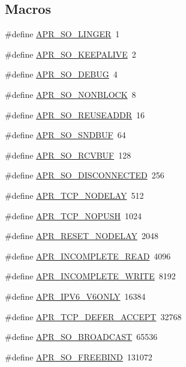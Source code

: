 \subsection*{Macros}
\begin{DoxyCompactItemize}
\item 
\#define \hyperlink{group__apr__sockopt_ga6a807e7b78937ab74a4fcd6e99d76669}{A\+P\+R\+\_\+\+S\+O\+\_\+\+L\+I\+N\+G\+ER}~1
\item 
\#define \hyperlink{group__apr__sockopt_ga0c54c5b98593d9ad2f8cc8836da7eae5}{A\+P\+R\+\_\+\+S\+O\+\_\+\+K\+E\+E\+P\+A\+L\+I\+VE}~2
\item 
\#define \hyperlink{group__apr__sockopt_ga2b30d26f69059692e97a59ec1d6db73b}{A\+P\+R\+\_\+\+S\+O\+\_\+\+D\+E\+B\+UG}~4
\item 
\#define \hyperlink{group__apr__sockopt_gac3bf19cc28b43da9b9dc396c84914a0f}{A\+P\+R\+\_\+\+S\+O\+\_\+\+N\+O\+N\+B\+L\+O\+CK}~8
\item 
\#define \hyperlink{group__apr__sockopt_ga90434074950efa1383d7c5649026a159}{A\+P\+R\+\_\+\+S\+O\+\_\+\+R\+E\+U\+S\+E\+A\+D\+DR}~16
\item 
\#define \hyperlink{group__apr__sockopt_ga0e7ef8d3785eec5210ede9fd309db35f}{A\+P\+R\+\_\+\+S\+O\+\_\+\+S\+N\+D\+B\+UF}~64
\item 
\#define \hyperlink{group__apr__sockopt_ga4ab9494893075c8db6ac26a997f41f0e}{A\+P\+R\+\_\+\+S\+O\+\_\+\+R\+C\+V\+B\+UF}~128
\item 
\#define \hyperlink{group__apr__sockopt_ga5fd72839e254ddec03ffb624c21fa564}{A\+P\+R\+\_\+\+S\+O\+\_\+\+D\+I\+S\+C\+O\+N\+N\+E\+C\+T\+ED}~256
\item 
\#define \hyperlink{group__apr__sockopt_ga24db924d850dea792e92be7f8bc45cbd}{A\+P\+R\+\_\+\+T\+C\+P\+\_\+\+N\+O\+D\+E\+L\+AY}~512
\item 
\#define \hyperlink{group__apr__sockopt_ga7679a9e3114815eb6c31d26db707975d}{A\+P\+R\+\_\+\+T\+C\+P\+\_\+\+N\+O\+P\+U\+SH}~1024
\item 
\#define \hyperlink{group__apr__sockopt_gac9ee12e841eefaf86fabaae4a298adea}{A\+P\+R\+\_\+\+R\+E\+S\+E\+T\+\_\+\+N\+O\+D\+E\+L\+AY}~2048
\item 
\#define \hyperlink{group__apr__sockopt_ga73b6c80791c5148c2a416e03a8a1ff8a}{A\+P\+R\+\_\+\+I\+N\+C\+O\+M\+P\+L\+E\+T\+E\+\_\+\+R\+E\+AD}~4096
\item 
\#define \hyperlink{group__apr__sockopt_ga0c1544983845bf747b4a2a3facfb45e9}{A\+P\+R\+\_\+\+I\+N\+C\+O\+M\+P\+L\+E\+T\+E\+\_\+\+W\+R\+I\+TE}~8192
\item 
\#define \hyperlink{group__apr__sockopt_gae1126f69a19a23c484e3292b016375df}{A\+P\+R\+\_\+\+I\+P\+V6\+\_\+\+V6\+O\+N\+LY}~16384
\item 
\#define \hyperlink{group__apr__sockopt_gaa81adac9b40a87f1d4c0c2f037e9af78}{A\+P\+R\+\_\+\+T\+C\+P\+\_\+\+D\+E\+F\+E\+R\+\_\+\+A\+C\+C\+E\+PT}~32768
\item 
\#define \hyperlink{group__apr__sockopt_ga6d86c537799f60d68d2016563beef15b}{A\+P\+R\+\_\+\+S\+O\+\_\+\+B\+R\+O\+A\+D\+C\+A\+ST}~65536
\item 
\#define \hyperlink{group__apr__sockopt_ga3e873ecb577af3c70736e762358858d9}{A\+P\+R\+\_\+\+S\+O\+\_\+\+F\+R\+E\+E\+B\+I\+ND}~131072
\end{DoxyCompactItemize}


